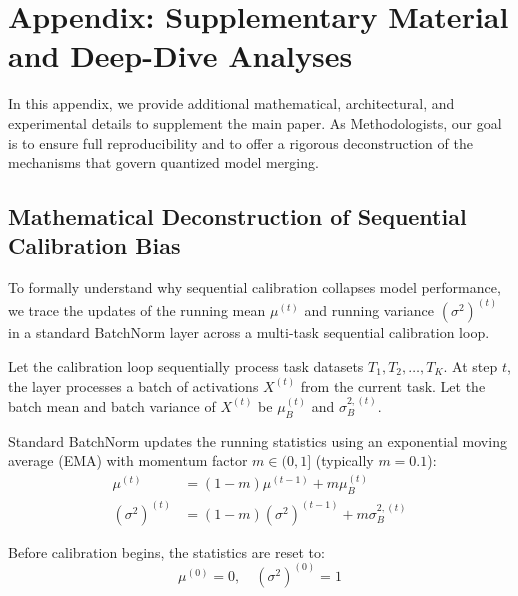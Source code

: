 \documentclass{article}
\theoremstyle{plain}
\theoremstyle{definition}
\theoremstyle{remark}
\begin{document}



\newpage
\appendix
\onecolumn
\section{Appendix: Supplementary Material and Deep-Dive Analyses}
\label{sec:appendix}

In this appendix, we provide additional mathematical, architectural, and experimental details to supplement the main paper. As Methodologists, our goal is to ensure full reproducibility and to offer a rigorous deconstruction of the mechanisms that govern quantized model merging.

\subsection{Mathematical Deconstruction of Sequential Calibration Bias}
\label{app:seq_cal_math}
To formally understand why sequential calibration collapses model performance, we trace the updates of the running mean $\mu^{(t)}$ and running variance $(\sigma^2)^{(t)}$ in a standard BatchNorm layer across a multi-task sequential calibration loop.

Let the calibration loop sequentially process task datasets $T_1, T_2, \dots, T_K$. At step $t$, the layer processes a batch of activations $X^{(t)}$ from the current task. Let the batch mean and batch variance of $X^{(t)}$ be $\mu_B^{(t)}$ and $\sigma_B^{2,(t)}$. 

Standard BatchNorm updates the running statistics using an exponential moving average (EMA) with momentum factor $m \in (0, 1]$ (typically $m = 0.1$):
\begin{align}
    \mu^{(t)} &= (1 - m) \mu^{(t-1)} + m \mu_B^{(t)} \\
    (\sigma^2)^{(t)} &= (1 - m) (\sigma^2)^{(t-1)} + m \sigma_B^{2,(t)}
\end{align}

Before calibration begins, the statistics are reset to:
\begin{equation}
    \mu^{(0)} = 0, \quad (\sigma^2)^{(0)} = 1
\end{equation}
\end{document}
